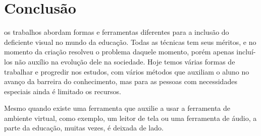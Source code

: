 \documentclass[12pt,journal,compsoc]{IEEEtran}
\begin{document}
\section{Conclusão}
 os trabalhos abordam formas e ferramentas diferentes para a inclusão do deficiente visual no mundo da educação. 
Todas as técnicas tem seus méritos, e no momento da criação resolveu o problema daquele momento, porém apenas incluí-los 
não auxílio na evolução dele na sociedade. Hoje temos várias formas de trabalhar e progredir nos estudos, com vários métodos 
que auxiliam o aluno no avanço da barreira do conhecimento, mas para as pessoas com necessidades especiais ainda é limitado 
os recursos.

Mesmo quando existe uma ferramenta que auxilie a usar a ferramenta de ambiente virtual, como exemplo, um leitor de 
tela ou uma ferramenta de áudio, a parte da educação, muitas vezes, é deixada de lado.






\ifCLASSOPTIONcaptionsoff
  \newpage
\fi




%
%

\end{document}

